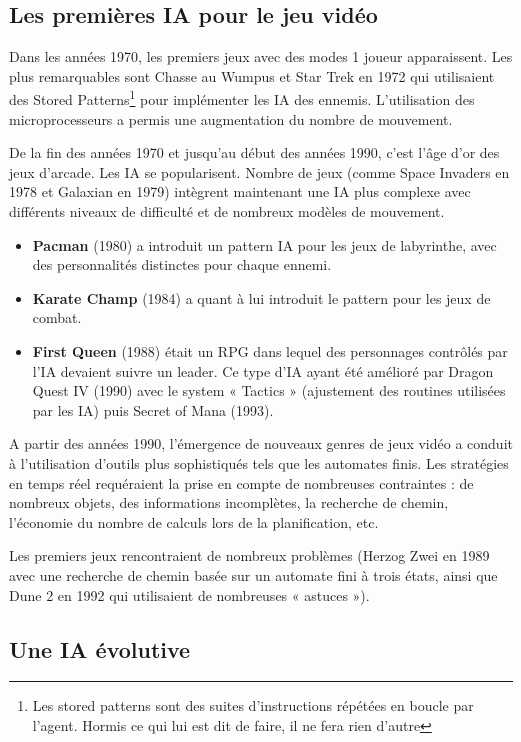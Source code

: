 \documentclass[a4paper, 12pt]{article} %
\begin{document}
\newpage
\subsection{Les premières IA pour le jeu vidéo}
Dans les années 1970, les premiers jeux avec des modes 1 joueur apparaissent. Les plus remarquables sont Chasse au Wumpus et Star Trek en 1972 qui utilisaient des Stored Patterns\footnote{Les stored patterns sont des suites d’instructions répétées en boucle par l’agent. Hormis ce qui lui est dit de faire, il ne fera rien d’autre}  pour implémenter les IA des ennemis. L’utilisation des microprocesseurs a permis une augmentation du nombre de mouvement. 

De la fin des années 1970 et jusqu’au début des années 1990\cite{history}, c’est l’âge d’or des jeux d’arcade. Les IA se popularisent. Nombre de jeux (comme Space Invaders en 1978 et Galaxian en 1979) intègrent maintenant une IA plus complexe avec différents niveaux de difficulté et de nombreux modèles de mouvement. 

\begin{itemize}
	\item \textbf{Pacman} (1980) a introduit un pattern IA pour les jeux de labyrinthe, avec des personnalités distinctes pour chaque ennemi.
	\item \textbf{Karate Champ} (1984) a quant à lui introduit le pattern pour les jeux de combat.
	\item \textbf{First Queen} (1988) était un RPG dans lequel des personnages contrôlés par l’IA devaient suivre un leader. Ce type d’IA ayant été amélioré par Dragon Quest IV (1990) avec le system « Tactics » (ajustement des routines utilisées par les IA) puis Secret of Mana (1993).
\end{itemize}

A partir des années 1990, l’émergence de nouveaux genres de jeux vidéo a conduit à l’utilisation d’outils plus sophistiqués tels que les automates finis. Les stratégies en temps réel requéraient la prise en compte de nombreuses contraintes : de nombreux objets, des informations incomplètes, la recherche de chemin, l’économie du nombre de calculs lors de la planification, etc. 

Les premiers jeux rencontraient de nombreux problèmes (Herzog Zwei en 1989 avec une recherche de chemin basée sur un automate fini à trois états, ainsi que Dune 2 en 1992 qui utilisaient de nombreuses « astuces »). 

\newpage
\subsection{Une IA évolutive}
\end{document}
